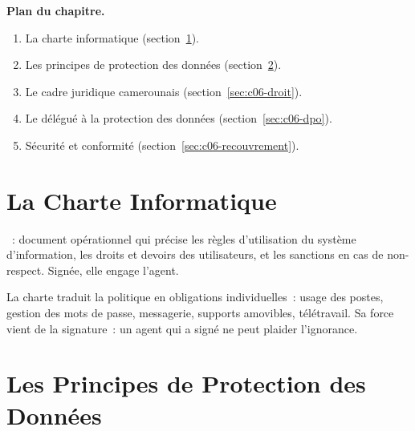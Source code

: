 \medskip
\textbf{Plan du chapitre.}
\begin{enumerate}
    \item La charte informatique (section~\ref{sec:c06-charte}).
    \item Les principes de protection des données (section~\ref{sec:c06-principes}).
    \item Le cadre juridique camerounais (section~\ref{sec:c06-droit}).
    \item Le délégué à la protection des données (section~\ref{sec:c06-dpo}).
    \item Sécurité et conformité (section~\ref{sec:c06-recouvrement}).
\end{enumerate}

\separateur

\section{La Charte Informatique}
\label{sec:c06-charte}

\begin{boxdef}
~: document opérationnel qui précise les règles
d'utilisation du système d'information, les droits et devoirs des utilisateurs,
et les sanctions en cas de non-respect. Signée, elle engage l'agent.
\end{boxdef}

La charte traduit la politique en obligations individuelles~: usage des postes,
gestion des mots de passe, messagerie, supports amovibles, télétravail. Sa
force vient de la signature~: un agent qui a signé ne peut plaider
l'ignorance.

\section{Les Principes de Protection des Données}
\label{sec:c06-principes}

